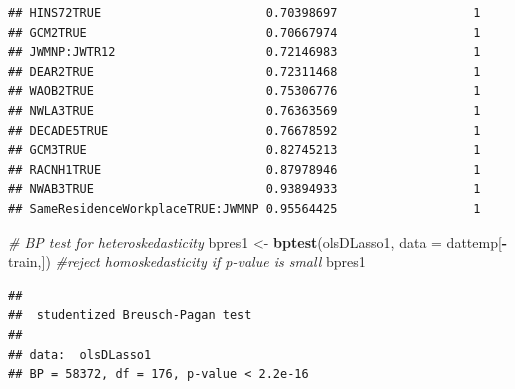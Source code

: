 \documentclass[
]{article}
\newenvironment{Shaded}{\begin{snugshade}}{\end{snugshade}}
\newcommand{\CommentTok}[1]{\textcolor[rgb]{0.56,0.35,0.01}{\textit{#1}}}
\newcommand{\ControlFlowTok}[1]{\textcolor[rgb]{0.13,0.29,0.53}{\textbf{#1}}}
\newcommand{\DataTypeTok}[1]{\textcolor[rgb]{0.13,0.29,0.53}{#1}}
\newcommand{\FloatTok}[1]{\textcolor[rgb]{0.00,0.00,0.81}{#1}}
\newcommand{\KeywordTok}[1]{\textcolor[rgb]{0.13,0.29,0.53}{\textbf{#1}}}
\newcommand{\NormalTok}[1]{#1}
\newcommand{\OperatorTok}[1]{\textcolor[rgb]{0.81,0.36,0.00}{\textbf{#1}}}
\newcommand{\StringTok}[1]{\textcolor[rgb]{0.31,0.60,0.02}{#1}}
\begin{document}
\begin{verbatim}
## HINS72TRUE                       0.70398697                   1           
## GCM2TRUE                         0.70667974                   1           
## JWMNP:JWTR12                     0.72146983                   1           
## DEAR2TRUE                        0.72311468                   1           
## WAOB2TRUE                        0.75306776                   1           
## NWLA3TRUE                        0.76363569                   1           
## DECADE5TRUE                      0.76678592                   1           
## GCM3TRUE                         0.82745213                   1           
## RACNH1TRUE                       0.87978946                   1           
## NWAB3TRUE                        0.93894933                   1           
## SameResidenceWorkplaceTRUE:JWMNP 0.95564425                   1
\end{verbatim}

\begin{Shaded}
\begin{Highlighting}[]
\CommentTok{# BP test for heteroskedasticity}
\NormalTok{bpres1 <-}\StringTok{ }\KeywordTok{bptest}\NormalTok{(olsDLasso1, }\DataTypeTok{data =}\NormalTok{ dattemp[}\OperatorTok{-}\NormalTok{train,]) }\CommentTok{#reject homoskedasticity if p-value is small}
\NormalTok{bpres1}
\end{Highlighting}
\end{Shaded}

\begin{verbatim}
## 
##  studentized Breusch-Pagan test
## 
## data:  olsDLasso1
## BP = 58372, df = 176, p-value < 2.2e-16
\end{verbatim}

\begin{Shaded}
\end{Shaded}
\end{document}
